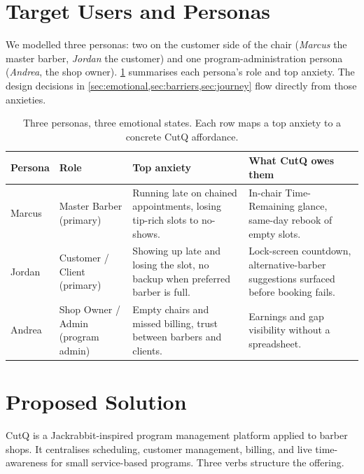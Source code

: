 \documentclass[12pt,a4paper]{article}
\begin{document}
\section{Target Users and Personas}
\label{sec:users}

We modelled three personas: two on the customer side of the chair
(\textit{Marcus} the master barber, \textit{Jordan} the customer)
and one program-administration persona (\textit{Andrea}, the shop
owner). \cref{tab:personas} summarises each persona's role and top
anxiety. The design decisions in
\cref{sec:emotional,sec:barriers,sec:journey} flow directly from
those anxieties.

\begin{table}[H]
\centering
\small
\begin{tabular}{@{}p{2.4cm}p{3.0cm}p{4.5cm}p{4.4cm}@{}}
\toprule
\textbf{Persona} & \textbf{Role} & \textbf{Top anxiety} & \textbf{What CutQ owes them}\\
\midrule
Marcus & Master Barber (primary) &
  Running late on chained appointments, losing tip-rich slots to no-shows. &
  In-chair Time-Remaining glance, same-day rebook of empty slots.\\
\addlinespace
Jordan & Customer / Client (primary) &
  Showing up late and losing the slot, no backup when preferred
  barber is full. &
  Lock-screen countdown, alternative-barber suggestions surfaced
  before booking fails.\\
\addlinespace
Andrea & Shop Owner / Admin (program admin) &
  Empty chairs and missed billing, trust between barbers and clients. &
  Earnings and gap visibility without a spreadsheet.\\
\bottomrule
\end{tabular}
\caption{Three personas, three emotional states. Each row maps a top
anxiety to a concrete CutQ affordance.}
\label{tab:personas}
\end{table}

\section{Proposed Solution}
\label{sec:solution}

CutQ is a Jackrabbit-inspired program management platform applied to
barber shops. It centralises scheduling, customer management,
billing, and live time-awareness for small service-based programs.
Three verbs structure the offering.
\end{document}
